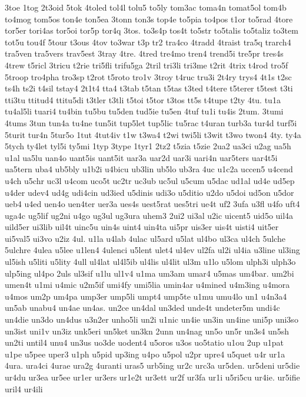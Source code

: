 {3toe
1tog
2t3oid
5tok
4toled
tol4l
tolu5
to5ly
tom3ac
toma4n
tomat5ol
tom4b
to4mog
tom5os
ton4e
ton5ea
3tonn
ton3s
top4e
to5pia
to4pos
t1or
to5rad
4tore
tor5er
tori4as
tor5oi
tor5p
tor4q
3tos.
to3s4p
tos4t
to5str
to5talis
to5taliz
to3tem
tot5u
tou4f
5tour
t3ous
4tov
to3war
t3p
tr2
tra4co
4tradd
4traist
tra5q
trarch4
tra5ven
tra5vers
trav5est
3tray
4tre.
4tred
tre4mo
tren4
trend5i
tre5pr
tres4s
4trew
t5ricl
3tricu
t2rie
tri5fli
trifu5ga
2tril
tri3li
tri3me
t2rit
4trix
t4rod
tro5f
5troop
tro4pha
tro3sp
t2rot
t5roto
tro1v
3troy
t4ruc
tru3i
2t4ry
trys4
4t1s
t2sc
ts4h
ts2i
t4sil
tstay4
2t1t4
tta4
t3tab
t5tan
t5tas
t3ted
t4tere
t5terer
t5test
t3ti
tti3tu
ttitud4
ttitu5di
t3tler
t3tli
t5toi
t5tor
t3tos
tt5s
t4tupe
t2ty
4tu.
tu1a
tu4al5li
tuari4
tu4bin
tu5bu
tu5den
tud5ie
tu5en
4tuf
tu1i
tu4is
2tum.
3tumi
4tums
3tun
tun4a
tu4ne
tun5it
tup5let
tup5lic
tu5rac
t4uran
turb3a
tur4d
turf5i
5turit
tur4n
5tur5o
1tut
4tut4iv
t1w
t3wa4
t2wi
twi5li
t3wit
t3wo
twon4
4ty.
ty4a
5tych
ty4let
tyl5i
ty5mi
1typ
3type
1tyr1
2tz2
t5zia
t5zie
2ua2
ua3ci
u2ag
ua5h
u1al
ua5lu
uan4o
uant5is
uant5it
uar3a
uar2d
uar3i
uari4n
uar5ters
uar4t5i
ua5tern
uba4
ub5bly
u1b2i
u4bicu
ub3lin
ub5lo
ub3ra
4uc
u1c2a
uccen5
u4cend
u4ch
u5chr
uc3l
u4com
uco5t
uc2tr
uc3ub
uc5ul
u5cum
u5dac
ud1al
ud4e
ud5ep
u4der
udev4
ud4g
udi4cin
ud3ied
u5dinis
udi3o
u5ditio
u2do
u5doi
ud5on
u5dor
ueb4
u4ed
uen4o
uen4ter
uer3a
ues4s
uest5rat
ues5tri
ue4t
uf2
3ufa
u3fl
u4fo
uft4
uga4c
ug5lif
ug2ni
u4go
ug3ul
ug3ura
uhem3
2ui2
ui3al
u2ic
uicent5
uid5o
uil4a
uild5er
ui3lib
uil4t
uinc5u
uin4s
uint4
uin4ta
ui5pr
uis3er
uis4t
uisti4
uit5er
ui5val5
ui3vo
u2iz
4ul.
u1la
u4lab
4ulac
ul5ard
u5lat
ul4bo
ul3ca
ul4ch
5ulche
5ulchre
4ulea
u5lee
u1len4
4ulenci
u5lent
ulet4
ul4ev
ul2fa
ul2i
ul4ia
u3line
ul3ing
ul5ish
u5liti
u5lity
4ull
ul4lat
ul4l5ib
ul4lis
ul4lit
ul3m
u1lo
u5lom
ulph3i
ulph3o
ulp5ing
ul4po
2uls
ul3sif
u1lu
ul1v4
u1ma
um3am
umar4
u5mas
um4bar.
um2bi
umen4t
u1mi
u4mic
u2m5if
umi4fy
umi5lia
umin4ar
u4mined
u4m3ing
u4mora
u4mos
um2p
um4pa
ump3er
ump5li
umpt4
ump5te
u1mu
umu4lo
un1
u4n3a4
un5ab
unabu4
un4ae
un4as.
un2ce
un4dal
un3ded
unde4t
undeter5m
undi4c
un4die
un3do
un4dus
u3n2er
unho5li
un2i
u1nic
un4ie
un3in
un4ine
uni5p
uni3so
un3ist
uni1v
un3iz
unk5eri
un5ket
un3kn
2unn
un4nag
un5o
un5r
un3s4
un5sh
un2ti
until4
unu4
un3us
uo3de
uodent4
u5oros
u3os
uo5tatio
u1ou
2up
u1pat
u1pe
u5pee
uper3
u1ph
u5pid
up3ing
u4po
u5pol
u2pr
upre4
u5quet
u4r
ur1a
4ura.
ura4ci
4urae
ura2g
4uranti
uras5
urb5ing
ur2c
urc3a
ur5den.
ur5deni
ur5die
ur4du
ur3ea
ur5ee
ur1er
ur3ers
ur1e2t
ur3ett
ur2f
ur3fa
ur1i
u5ri5cu
ur4ie.
ur5ifie
uril4
ur4ili
}
